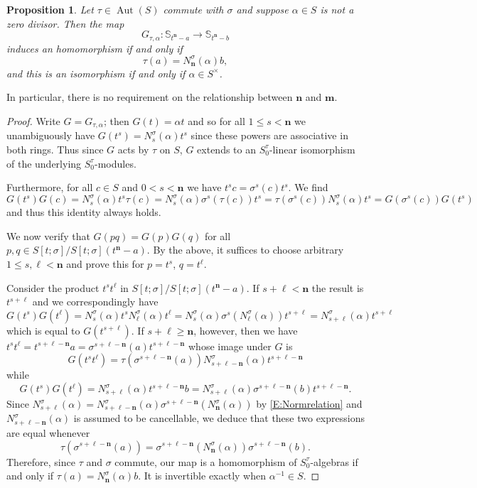 \documentclass[11pt]{amsart}
\theoremstyle{plain}
\newtheorem{proposition}[theorem]{Proposition}
\theoremstyle{definition}
\numberwithin{equation}{section}
\numberwithin{figure}{section}
\newcommand{\Sone}[1]{\Stsigma/\Stsigma (t^{\de}-#1)} %
\newcommand{\ring}{S}
\newcommand{\Stsigma}{S[t;\sigma]}
\newcommand{\os}{\mathbf{m}}  %
\newcommand{\de}{\mathbf{n}}  %
\DeclareMathOperator{\Aut}{Aut}
\begin{document}
\begin{proposition}\label{L:Gtaualpha}
    Let $\tau\in \Aut(\ring)$ commute with $\sigma$ and suppose $\alpha\in \ring$ is not a zero divisor.  Then the map
    $$
    G_{\tau,\alpha}: \mathbb{S}_{t^\de-a} \to \mathbb{S}_{t^\de-b}
    $$
    induces an homomorphism  if and only if
    $$
    \tau(a) = N_{\de}^\sigma(\alpha) b,
    $$
    and this is an isomorphism if and only if $\alpha \in \ring^\times$.
\end{proposition}

In particular, there is no requirement on the relationship between $\de$ and $\os$.

\begin{proof}
    Write $G=G_{\tau,\alpha}$; then $G(t)=\alpha t$ and so for all $1\leq s < \de$ we unambiguously have $G(t^s)=N_s^\sigma(\alpha)t^s$ since these powers are associative in both rings.   Thus since $G$ acts by $\tau$ on $\ring$, $G$ extends  to an $\ring_0^\tau$-linear isomorphism of the underlying $\ring_0^\tau$-modules.

    Furthermore, for all $c\in \ring$ and $0<s<\de$ we have $t^sc=\sigma^s(c)t^s$.  We find
    $$
    G(t^s)G(c)=N_s^\sigma(\alpha)t^s \tau(c)=N_s^\sigma(\alpha)\sigma^s(\tau(c))t^s = \tau(\sigma^s(c))N_s^\sigma(\alpha)t^s=G(\sigma^s(c))G(t^s)
    $$
    and thus this identity always holds.

    We now verify that $G(pq)=G(p)G(q)$ for all $p,q\in \Sone{a}$. By the above, it suffices to choose arbitrary $1\leq s,\ell <\de$ and prove this for $p=t^s$, $q=t^\ell$.

    Consider the product $t^{s}t^\ell$ in $\Sone{a}$.  If $s+\ell<\de$ the result is $t^{s+\ell}$ and we correspondingly have
    $$
    G(t^s)G(t^\ell) = N_s^\sigma(\alpha)t^s N_\ell^\sigma(\alpha)t^\ell = N_{s}^\sigma(\alpha)\sigma^s(N_\ell^\sigma(\alpha))t^{s+\ell} = N_{s+\ell}^\sigma(\alpha)t^{s+\ell}
    $$
    which is equal to $G(t^{s+\ell})$.
    If $s+\ell\geq \de$, however, then we have $t^st^\ell = t^{s+\ell-\de}a=\sigma^{s+\ell-\de}(a)t^{s+\ell-\de}$ whose image under $G$ is
    $$
    G(t^st^\ell)=\tau(\sigma^{s+\ell-\de}(a))N_{s+\ell-\de}^\sigma(\alpha)t^{s+\ell-\de}
    $$
    while
    $$
    G(t^s)G(t^\ell) = N_{s+\ell}^\sigma(\alpha)t^{s+\ell-\de}b=N_{s+\ell}^\sigma(\alpha)\sigma^{s+\ell-\de}(b)t^{s+\ell-\de}.
    $$
    Since $N_{s+\ell}^\sigma(\alpha)=N_{s+\ell-\de}^\sigma(\alpha)\sigma^{s+\ell-\de}(N_{\de}^\sigma(\alpha))$ by \eqref{E:Normrelation}
   and  $N^\sigma_{s+\ell-\de}(\alpha)$ is assumed to be cancellable, we deduce that these two expressions are equal whenever
    $$
    \tau(\sigma^{s+\ell-\de}(a))=\sigma^{s+\ell-\de}(N_{\de}^\sigma(\alpha))\sigma^{s+\ell-\de}(b).
    $$
    Therefore, since $\tau$ and $\sigma$ commute, our map is a homomorphism of $\ring_0^\tau$-algebras if and only if $\tau(a) = N_{\de}^\sigma(\alpha) b$.  It is invertible exactly when $\alpha^{-1}\in \ring$.
\end{proof}
\end{document}
